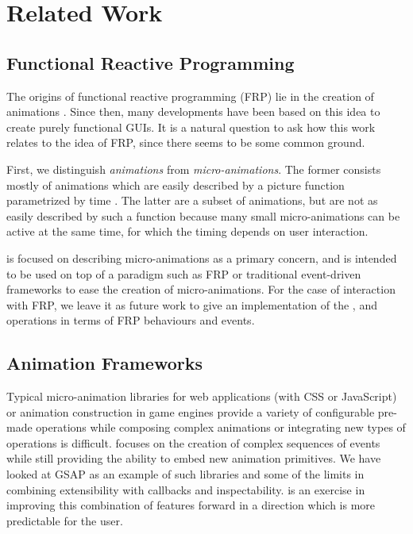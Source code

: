 \section{Related Work}
\label{sec:related}

\subsection{Functional Reactive Programming}
The origins of functional reactive programming (FRP) lie in the creation of animations \cite{DBLP:conf/icfp/ElliottH97}. Since then, many developments have been based on this idea to create purely functional GUIs. It is a natural question to ask how this work relates to the idea of FRP, since there seems to be some common ground.

First, we distinguish \emph{animations} from \emph{micro-animations}. The former consists mostly of animations which are easily described by a picture function parametrized by time . The latter are a subset of animations, but are not as easily described by such a function because many small micro-animations can be active at the same time, for which the timing depends on user interaction.

\dsl{} is focused on describing micro-animations as a primary concern, and is intended to be used on top of a paradigm such as FRP or traditional event-driven frameworks to ease the creation of micro-animations. For the case of interaction with FRP, we leave it as future work to give an implementation of the ,  and  operations in terms of FRP behaviours and events.

\subsection{Animation Frameworks}

Typical micro-animation libraries for web applications (with CSS or JavaScript) or animation construction in game engines provide a variety of configurable pre-made operations while composing complex animations or integrating new types of operations is difficult. \dsl{} focuses on the creation of complex sequences of events while still providing the ability to embed new animation primitives. We have looked at GSAP as an example of such libraries and some of the limits in combining extensibility with callbacks and inspectability. \dsl{} is an exercise in improving this combination of features forward in a direction which is more predictable for the user.

